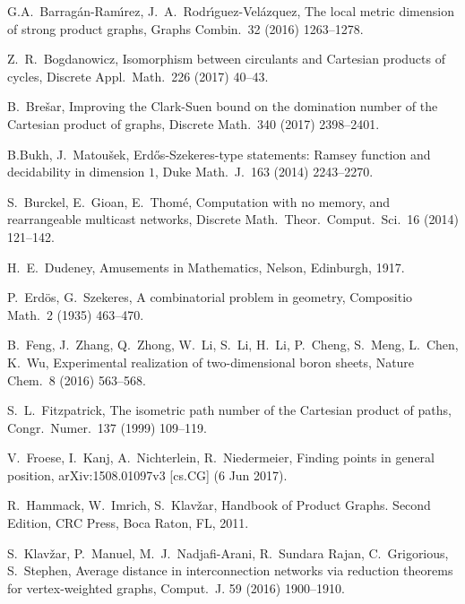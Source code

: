 \documentclass[12pt]{article}
\begin{document}
\begin{thebibliography}{99}

  G.A.~Barrag\'an-Ram\'\i rez, J.~A.~Rodr\'\i guez-Vel\'azquez, 
  The local metric dimension of strong product graphs,
  Graphs Combin.\ 32 (2016) 1263--1278.
  
  Z.~R.~Bogdanowicz, 
  Isomorphism between circulants and Cartesian products of cycles,
  Discrete Appl.\ Math.\ 226 (2017) 40--43. 

  B.~Bre\v sar, 
  Improving the Clark-Suen bound on the domination number of the Cartesian product of graphs,
  Discrete Math.\ 340 (2017) 2398--2401. 

  B.Bukh, J.~Matou\v sek, 
  Erd\H os-{S}zekeres-type statements: {R}amsey function and decidability in dimension $1$,
  Duke Math.\ J.\ 163 (2014) 2243--2270. 

  S.~Burckel, E.~Gioan, E.~Thom\'e, 
  Computation with no memory, and rearrangeable multicast networks,
  Discrete Math.\ Theor.\ Comput.\ Sci.\ 16 (2014) 121--142. 

  H.~E.~Dudeney, 
  Amusements in Mathematics, 
  Nelson, Edinburgh, 1917. 

  P.~Erd\"os, G.~Szekeres, 
  A combinatorial problem in geometry, 
  Compositio Math.\ 2 (1935) 463--470. 

  B.~Feng, J.~Zhang, Q.~Zhong, W.~Li, S.~Li, H.~Li, P.~Cheng, S.~Meng, L.~Chen, K.~Wu,
  Experimental realization of two-dimensional boron sheets,
  Nature Chem.\ 8 (2016) 563--568.

  S.~L.~Fitzpatrick, 
  The isometric path number of the Cartesian product of paths, 
  Congr.\ Numer.\ 137 (1999) 109--119.

  V.~Froese, I.~Kanj, A.~Nichterlein, R.~Niedermeier, 
  Finding points in general position, 
  arXiv:1508.01097v3 [cs.CG] (6 Jun 2017). 
  
  R.~Hammack, W.~Imrich, S.~Klav\v{z}ar, 
  Handbook of Product Graphs. Second Edition,
  CRC Press, Boca Raton, FL, 2011. 

  S.~Klav\v{z}ar, P.~Manuel, M.~J.~Nadjafi-Arani, R.~Sundara Rajan, C.~Grigorious, S.~Stephen,
  Average distance in interconnection networks via reduction theorems for vertex-weighted graphs,
  Comput.\ J. 59 (2016) 1900--1910.


\end{thebibliography}
\end{document}

